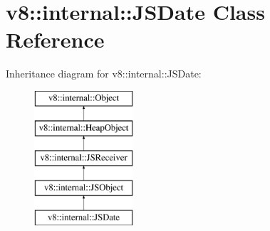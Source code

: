 \hypertarget{classv8_1_1internal_1_1_j_s_date}{}\section{v8\+:\+:internal\+:\+:J\+S\+Date Class Reference}
\label{classv8_1_1internal_1_1_j_s_date}
Inheritance diagram for v8\+:\+:internal\+:\+:J\+S\+Date\+:\begin{figure}[H]
\begin{center}
\leavevmode
\includegraphics[height=5.000000cm]{classv8_1_1internal_1_1_j_s_date}
\end{center}
\end{figure}
